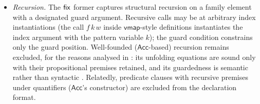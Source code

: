 \begin{itemize}[leftmargin=2em]
  denote one element --- \cref{sec:semantics}), and is the
  translation-level counterpart of the rule that erased data may appear
  in indices only where nothing relevant observes them
  \cite{Atkey2018,GilbertEtAl2019}.  Proof \emph{subterms} of index
  terms, by contrast, are in the fragment and are erased structurally
  (\cref{rem:proof-indices}).
\item \emph{Recursion.}  The $\mathsf{fix}$ former captures structural
  recursion on a family element with a designated guard argument.
  Recursive calls may be at arbitrary index instantiations (the call
  $f\,k\,w$ inside $\mathsf{vmap}$-style definitions instantiates the
  index argument with the pattern variable $k$); the guard condition
  constrains only the guard position.  Well-founded
  ($\mathsf{Acc}$-based) recursion remains excluded, for the reasons
  analysed in \cite[\S 10.3]{Extraction2026}: its unfolding equations
  are sound only with their propositional premises retained, and its
  guardedness is semantic rather than syntactic
  \cite{GilbertEtAl2019}.  Relatedly, predicate clauses with recursive
  premises under quantifiers ($\mathsf{Acc}$'s constructor) are excluded
  from the declaration format.
\end{itemize}
